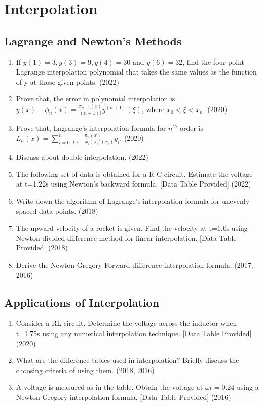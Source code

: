 \documentclass[12pt, a4paper]{article}
\begin{document}
	
	\section{Interpolation}
	
	\subsection{Lagrange and Newton's Methods}
	\begin{enumerate}
		\item If $y(1)=3, y(3)=9, y(4)=30$ and $y(6)=32$, find the four point Lagrange interpolation polynomial that takes the same values as the function of y at those given points. (2022)
		\item Prove that, the error in polynomial interpolation is $y(x) - \phi_n(x) = \frac{\pi_{n+1}(x)}{(n+1)!} y^{(n+1)}(\xi)$, where $x_0 < \xi < x_n$. (2020)
		\item Prove that, Lagrange's interpolation formula for $n^{th}$ order is $L_n(x) = \sum_{i=0}^n \frac{\pi_n(x)}{(x-x_i)\pi_n'(x_i)} y_i$. (2020)
		\item Discuss about double interpolation. (2022)
		\item The following set of data is obtained for a R-C circuit. Estimate the voltage at t=1.22s using Newton's backward formula. [Data Table Provided] (2022)
		\item Write down the algorithm of Lagrange's interpolation formula for unevenly spaced data points. (2018)
		\item The upward velocity of a rocket is given. Find the velocity at t=1.6s using Newton divided difference method for linear interpolation. [Data Table Provided] (2018)
		\item Derive the Newton-Gregory Forward difference interpolation formula. (2017, 2016)
	\end{enumerate}
	
	\subsection{Applications of Interpolation}
	\begin{enumerate}
		\item Consider a RL circuit. Determine the voltage across the inductor when t=1.75s using any numerical interpolation technique. [Data Table Provided] (2020)
		\item What are the difference tables used in interpolation? Briefly discuss the choosing criteria of using them. (2018, 2016)
		\item A voltage is measured as in the table. Obtain the voltage at $\omega t = 0.24$ using a Newton-Gregory interpolation formula. [Data Table Provided] (2016)
	\end{enumerate}
	
\end{document}

